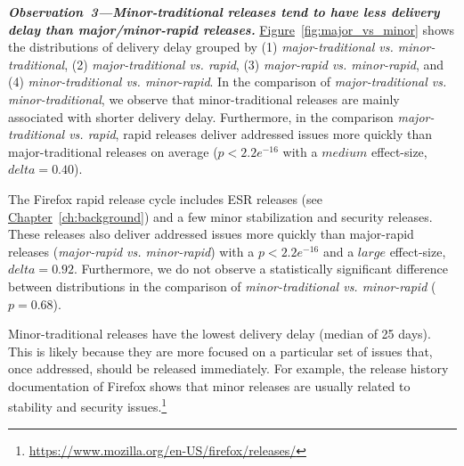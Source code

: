 \begin{sloppypar}
\noindent\textit{\textbf{Observation~3---Minor-traditional releases tend to have
less delivery delay than major/minor-rapid releases.}}
\hyperref[fig:major_vs_minor]{Figure}~\ref{fig:major_vs_minor} shows the distributions of delivery delay
grouped by (1) \textit{major-traditional vs. minor-traditional}, (2)
\textit{major-traditional vs. rapid}, (3) \textit{major-rapid vs. minor-rapid},
and (4) \textit{minor-traditional vs. minor-rapid}. In the comparison of
\textit{major-traditional vs.  minor-traditional}, we observe that
minor-traditional releases are mainly associated with shorter delivery delay.
Furthermore, in the comparison \textit{major-traditional vs. rapid}, rapid
releases deliver addressed issues more quickly than major-traditional releases
on average ($p<2.2e^{-16}$ with a $medium$ effect-size, \ie  $delta=0.40$). 
\end{sloppypar}

The Firefox rapid release cycle includes ESR releases (see
\hyperref[ch:background]{Chapter}~\ref{ch:background}) and a few minor
stabilization and security releases. These releases also deliver addressed
issues more quickly than major-rapid releases (\textit{major-rapid vs.
minor-rapid}) with a $p<2.2e^{-16}$ and a $large$ effect-size, \ie $delta=0.92$.
Furthermore, we do not observe a statistically significant difference between
distributions in the comparison of \textit{minor-traditional vs. minor-rapid}
($p=0.68$).

Minor-traditional releases have the lowest delivery delay (median of 25
days). This is likely because they are more focused on a particular set of
issues that, once addressed, should be released immediately. For example, the
release history documentation of Firefox shows that minor releases are usually
related to stability and security
issues.\footnote{\url{https://www.mozilla.org/en-US/firefox/releases/}}\\

